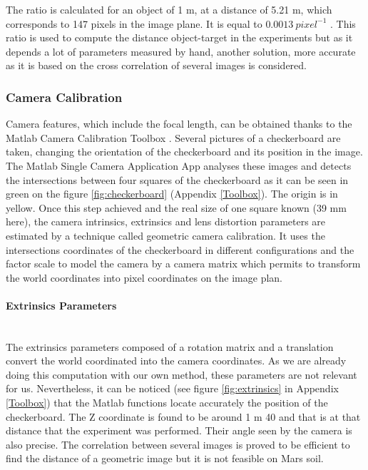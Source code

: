 The ratio is calculated for an object of 1 m, at a distance of 5.21 m, which corresponds to 147 pixels in the image plane. It is equal to $0.0013 \ pixel^{-1}$ . This ratio is used to compute the distance object-target in the experiments but as it depends a lot of parameters measured by hand, another solution, more accurate as it is based on the cross correlation of several images is considered. 

\subsubsection{Camera Calibration}
Camera features, which include the focal length, can be obtained thanks to the Matlab Camera Calibration Toolbox \cite{matlabtoolbox}. Several pictures of a checkerboard are taken, changing the orientation of the checkerboard and its position in the image. The Matlab Single Camera Application App analyses these images and detects the intersections between four squares of the checkerboard as it can be seen in green on the figure \ref{fig:checkerboard} (Appendix \ref{Toolbox}). The origin is in yellow. Once this step achieved and the real size of one square known (39 mm here), the camera intrinsics, extrinsics and lens distortion parameters are estimated by a technique called geometric camera calibration. It uses the intersections coordinates of the checkerboard in different configurations and the factor scale to model the camera by a camera matrix which permits to transform the world coordinates into pixel coordinates on the image plan.

\paragraph*{Extrinsics Parameters}
~\\
The extrinsics parameters composed of a rotation matrix and a translation convert the world coordinated into the camera coordinates. As we are already doing this computation with our own method, these parameters are not relevant for us. Nevertheless, it can be noticed (see figure \ref{fig:extrinsics} in Appendix \ref{Toolbox}) that the Matlab functions locate accurately the position of the checkerboard. The Z coordinate is found to be around 1 m 40 and that is at that distance that the experiment was performed. Their angle seen by the camera is also precise. The correlation between several images is proved to be efficient to find the distance of a geometric image but it is not feasible on Mars soil.

